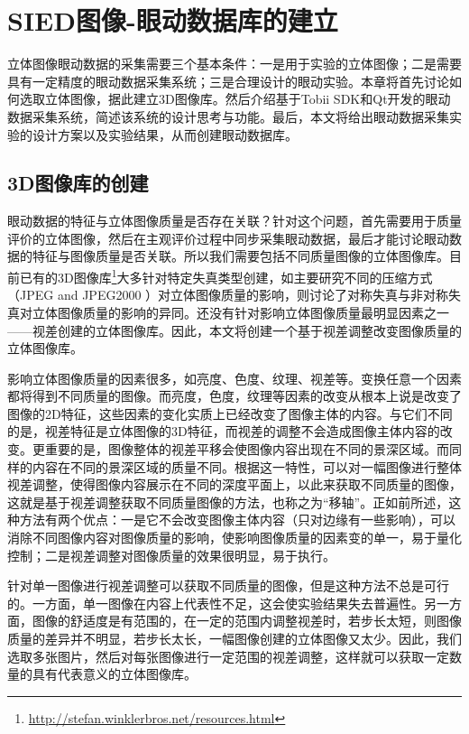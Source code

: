 \chapter{SIED图像-眼动数据库的建立}
\label{chap:databaseconstruction}
立体图像眼动数据的采集需要三个基本条件：一是用于实验的立体图像；二是需要具有一定精度的眼动数据采集系统；三是合理设计的眼动实验。本章将首先讨论如何选取立体图像，据此建立3D图像库。然后介绍基于Tobii SDK和Qt开发的眼动数据采集系统，简述该系统的设计思考与功能。最后，本文将给出眼动数据采集实验的设计方案以及实验结果，从而创建眼动数据库。
\section{3D图像库的创建}
\label{sec:imagedatabase}
眼动数据的特征与立体图像质量是否存在关联？针对这个问题，首先需要用于质量评价的立体图像，然后在主观评价过程中同步采集眼动数据，最后才能讨论眼动数据的特征与图像质量是否关联。所以我们需要包括不同质量图像的立体图像库。目前已有的3D图像库\footnote{\url{http://stefan.winklerbros.net/resources.html}}大多针对特定失真类型创建\parencite{benoit2008quality,moorthy2013subjective}，如\parencite{benoit2008quality}主要研究不同的压缩方式（JPEG and JPEG2000 ）对立体图像质量的影响，\parencite{moorthy2013subjective}则讨论了对称失真与非对称失真对立体图像质量的影响的异同。还没有针对影响立体图像质量最明显因素之一——视差创建的立体图像库。因此，本文将创建一个基于视差调整改变图像质量的立体图像库。

影响立体图像质量的因素很多，如亮度、色度、纹理、视差等。变换任意一个因素都将得到不同质量的图像。而亮度，色度，纹理等因素的改变从根本上说是改变了图像的2D特征，这些因素的变化实质上已经改变了图像主体的内容。与它们不同的是，视差特征是立体图像的3D特征，而视差的调整不会造成图像主体内容的改变。更重要的是，图像整体的视差平移会使图像内容出现在不同的景深区域。而同样的内容在不同的景深区域的质量不同\parencite{lambooij2009visual}。根据这一特性，可以对一幅图像进行整体视差调整，使得图像内容展示在不同的深度平面上，以此来获取不同质量的图像，这就是基于视差调整获取不同质量图像的方法，也称之为“移轴”。正如前所述，这种方法有两个优点：一是它不会改变图像主体内容（只对边缘有一些影响），可以消除不同图像内容对图像质量的影响，使影响图像质量的因素变的单一，易于量化控制；二是视差调整对图像质量的效果很明显，易于执行。

针对单一图像进行视差调整可以获取不同质量的图像，但是这种方法不总是可行的。一方面，单一图像在内容上代表性不足，这会使实验结果失去普遍性。另一方面，图像的舒适度是有范围的，在一定的范围内调整视差时，若步长太短，则图像质量的差异并不明显，若步长太长，一幅图像创建的立体图像又太少。因此，我们选取多张图片，然后对每张图像进行一定范围的视差调整，这样就可以获取一定数量的具有代表意义的立体图像库。

